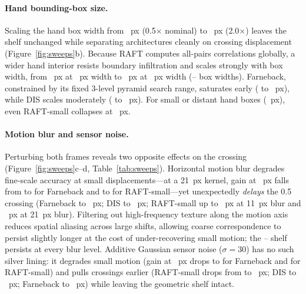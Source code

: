 \documentclass[11pt]{article}
\begin{document}
\paragraph{Hand bounding-box size.}
Scaling the hand box width from \cgBoxWidthSmall{}~px (0.5$\times$ nominal) to
\cgBoxWidthLarge{}~px (2.0$\times$) leaves the \cgRatio{} shelf unchanged while separating
architectures cleanly on crossing displacement (Figure~\ref{fig:sweeps}b). Because RAFT computes
all-pairs correlations globally, a wider hand interior resists boundary infiltration and scales
strongly with box width, from \cgBoxHalfRaftSmall{}~px at \cgBoxWidthSmall{}~px width to
\cgBoxHalfRaftLarge{}~px at \cgBoxWidthLarge{}~px width (\cgBoxRatioLo{}--\cgBoxRatioHi{} box
widths). Farneback, constrained by its fixed 3-level pyramid search range, saturates early
(\cgBoxHalfFarSmall{} to \cgBoxHalfFarLarge{}~px), while DIS scales moderately
(\cgBoxHalfDisSmall{} to \cgBoxHalfDisLarge{}~px). For small or distant hand boxes
(\cgBoxWidthSmall{}~px), even RAFT-small collapses at \cgBoxHalfRaftSmall{}~px.

\paragraph{Motion blur and sensor noise.}
Perturbing both frames reveals two opposite effects on the crossing (Figure~\ref{fig:sweeps}c--d,
Table~\ref{tab:sweeps}). Horizontal motion blur degrades fine-scale accuracy at small
displacements---at a 21~px kernel, gain at \cgDispLow{}~px falls from \cgBlurFarGainZero{} to
\cgBlurFarGainMax{} for Farneback and to \cgBlurRaftGainMax{} for RAFT-small---yet unexpectedly
\emph{delays} the 0.5 crossing (Farneback \cgBlurFarHalfZero{} to \cgBlurFarHalfMax{}~px; DIS to
\cgBlurDisHalfMax{}~px; RAFT-small up to \cgBlurRaftHalfMid{}~px at 11~px blur and
\cgBlurRaftHalfMax{}~px at 21~px blur). Filtering out high-frequency texture along the motion axis
reduces spatial aliasing across large shifts, allowing coarse correspondence to persist slightly
longer at the cost of under-recovering small motion; the \cgBlurShelfMin{}--\cgBlurShelfMax{} shelf
persists at every blur level. Additive Gaussian sensor noise ($\sigma = 30$) has no such silver
lining: it degrades small motion (gain at \cgDispLow{}~px drops to \cgNoiseFarGainMax{} for
Farneback and \cgNoiseRaftGainMax{} for RAFT-small) and pulls crossings earlier (RAFT-small drops
from \cgNoiseRaftHalfZero{} to \cgNoiseRaftHalfMax{}~px; DIS to \cgNoiseDisHalfMax{}~px; Farneback
to \cgNoiseFarHalfMax{}~px) while leaving the geometric shelf intact.
\end{document}
